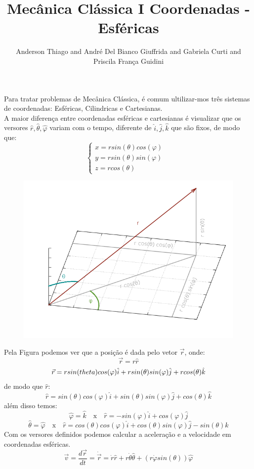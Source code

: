 \documentclass[a4paper,12pt, aps, rmp,twocolumn]{article}
\begin{document}
\title{ Mecânica Clássica I  Coordenadas - Esféricas}
\author{Anderson Thiago and André Del Bianco Giuffrida and  Gabriela
  Curti and Priscila França Guidini 
}
	\maketitle
	\indent Para tratar problemas de Mecânica Clássica, é comum ultilizar-mos três sistemas de coordenadas: Esféricas, Cilindricas e Cartesianas.\\
	\indent A maior diferença entre coordenadas esféricas e cartesianas é visualizar que os versores $\hat{r}, \hat{\theta}, \hat{\varphi}$ variam com o tempo, diferente de $\hat{i},\hat{j},\hat{k}$ que são fixos, de modo que:
	\begin{equation*}
		\begin{cases}
			x = r sin(\theta) cos(\varphi)  &\\
			y = r sin(\theta) sin(\varphi) &\\
			z = r cos(\theta) &
		\end{cases}
	\end{equation*}
	\begin{figure}[h]
		\begin{center}
			\includegraphics[scale=0.3]{SphericalCoordinates.png} 
		\end{center}
	\end{figure}
	
	 Pela Figura podemos ver que a posição é dada pelo vetor $\vec{r}$, onde:
	 \[ \vec{r} = r\hat{r} \]
	 \[ \vec{r} = r sin(\/theta) cos(\varphi) \hat{i} + r sin(\theta) sin(\varphi) \hat{j} + r cos(\theta) \hat{k} \]
	 de modo que $\hat{r}$:
	 \[ \hat{r} = sin(\theta) cos(\varphi) \hat{i} + sin(\theta) sin(\varphi) \hat{j} + cos(\theta) \hat{k} \]	
	 além disso temos:	
	 \[ \hat{\varphi} = \hat{k}\quad \text{x}\quad \hat{r}  = -sin(\varphi) \hat{i} + cos(\varphi) \hat{j}\]
	 \[ \hat{\theta} = \hat{\varphi}\quad  \text{x} \quad   \hat{r} = cos(\theta) cos(\varphi) \hat{i} + cos(\theta) sin(\varphi) \hat{j} -  sin(\theta) \hat{k}\]
	 \indent	Com os versores definidos podemos calcular a aceleração e a velocidade em coordenadas esféricas.
	 \[ \vec{v} = \frac{d \vec{r} }{dt} = \dot{\vec{r}} = \dot{r} \hat{r} + r\dot{\theta} \hat{\theta}+ ( r \dot{\varphi} sin(\theta) ) \hat{\varphi} \]
	 	
\end{document}
